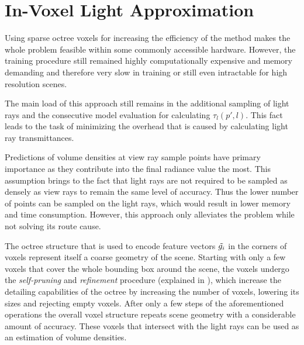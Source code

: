 \section{In-Voxel Light Approximation}
\label{sec:invoxel}

Using sparse octree voxels for increasing the efficiency of the method
makes the whole problem feasible within some commonly accessible hardware.
However, the training procedure still remained highly computationally expensive and memory demanding
and therefore very slow in training or still even intractable for high resolution scenes.

The main load of this approach still remains in the additional sampling of light rays
and the consecutive model evaluation for calculating $\tau_l(p', l)$.
This fact leads to the task of minimizing the overhead that is caused by calculating light ray transmittances.

Predictions of volume densities at view ray sample points have primary importance
as they contribute into the final radiance value the most.
This assumption brings to the fact that light rays are not required
to be sampled as densely as view rays to remain the same level of accuracy.
Thus the lower number of points can be sampled on the light rays,
which would result in lower memory and time consumption.
However, this approach only alleviates the problem while not solving its route cause.

The octree structure that is used to encode feature vectors $\Tilde{g_i}$ in the corners of voxels
represent itself a coarse geometry of the scene.
Starting with only a few voxels that cover the whole bounding box around the scene,
the voxels undergo the \textit{self-pruning} and \textit{refinement} procedure (explained in ),
which increase the detailing capabilities of the octree
by increasing the number of voxels, lowering its sizes and rejecting empty voxels.
After only a few steps of the aforementioned operations the overall voxel structure
repeats scene geometry with a considerable amount of accuracy.
These voxels that intersect with the light rays can be used as an estimation of volume densities.

